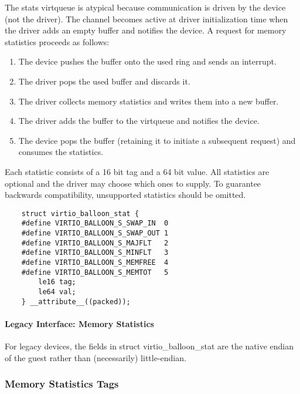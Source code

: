 The stats virtqueue is atypical because communication is driven
by the device (not the driver). The channel becomes active at
driver initialization time when the driver adds an empty buffer
and notifies the device. A request for memory statistics proceeds
as follows:

\begin{enumerate}
\item The device pushes the buffer onto the used ring and sends an
  interrupt.

\item The driver pops the used buffer and discards it.

\item The driver collects memory statistics and writes them into a
  new buffer.

\item The driver adds the buffer to the virtqueue and notifies the
  device.

\item The device pops the buffer (retaining it to initiate a
  subsequent request) and consumes the statistics.
\end{enumerate}

  Each statistic consists of a 16 bit
  tag and a 64 bit value. All statistics are optional and the
  driver may choose which ones to supply. To guarantee backwards
  compatibility, unsupported statistics should be omitted.

\begin{lstlisting}
	struct virtio_balloon_stat {
	#define VIRTIO_BALLOON_S_SWAP_IN  0
	#define VIRTIO_BALLOON_S_SWAP_OUT 1
	#define VIRTIO_BALLOON_S_MAJFLT   2
	#define VIRTIO_BALLOON_S_MINFLT   3
	#define VIRTIO_BALLOON_S_MEMFREE  4
	#define VIRTIO_BALLOON_S_MEMTOT   5
		le16 tag;
		le64 val;
	} __attribute__((packed));
\end{lstlisting}

\paragraph{Legacy Interface: Memory Statistics}\label{sec:Device Types / Memory Balloon Device / Device Operation / Memory Statistics / Legacy Interface: Memory Statistics}
For legacy devices, the fields in struct virtio_balloon_stat are the
native endian of the guest rather than (necessarily) little-endian.


\subsubsection{Memory Statistics Tags}\label{sec:Device Types / Memory Balloon Device / Device Operation / Memory Statistics Tags}

